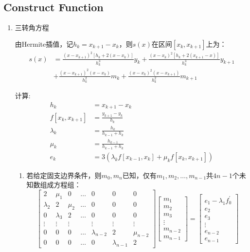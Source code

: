 \subsection{Construct Function}
\begin{enumerate}
\item 三转角方程

由Hermite插值，记$h_k = x_{k+1} - x_k$，则$s(x)$在区间$[x_k,x_{k+1}]$上为：
\begin{align}
s(x) &= \frac{(x-x_{k+1})^2 [h_{k}+2(x-x_{k})]}{h_{k}^3}y_{k}+\frac{(x-x_{k})^2 [h_{k}+2(x_{k+1}-x)]}{h_{k}^3}y_{k+1}\\
&+\frac{(x-x_{k+1})^2(x-x_k)}{h_k^2}m_k + \frac{(x-x_{k})^2(x-x_{k+1})}{h_k^2}m_{k+1}
\end{align}

计算:
\begin{align}
h_k &= x_{k+1} - x_k 
\\[4mm]
f[x_k,x_{k+1}] &= \frac{y_{k+1} - y_k}{h_k} 
\\[4mm]
\lambda_k &= \frac{h_k}{h_{k-1}+h_k} 
\\[4mm]
\mu_k &= \frac{h_{k-1}}{h_{k-1}+h_k} 
\\[4mm]
e_k &= 3(\lambda_k f[x_{k-1},x_k] + \mu_k f[x_k,x_{k+1}])
\end{align}

\begin{enumerate}
	\item 若给定固支边界条件，则$m_0,m_n$已知，仅有$m_1,m_2,\dots,m_{n-1}$共$4n-1$个未知数组成方程组：
		\begin{equation}
			\begin{bmatrix}
			2 & \mu_1 &0 &\dots &0 &0 &0 \\
			\lambda_2 &2 &\mu_2 &\dots &0 &0 &0 \\
			0 &\lambda_3 &2 &\dots &0 &0 &0 \\
			\vdots &\vdots &\vdots &\  &\vdots &\vdots &\vdots \\
			0 &0 &0 &\dots &\lambda_{n-2} &2 &\mu_{n-2} \\
			0 &0 &0 &\dots &0 &\lambda_{n-1} &2
			\end{bmatrix}
			\begin{bmatrix}
			m_1\\ m_2\\ m_3\\ \vdots \\ m_{n-2}\\ m_{n-1}
			\end{bmatrix}
			=
			\begin{bmatrix}
			e_1-\lambda_1f_0^{'}\\ e_2\\ e_3\\ \vdots \\ e_{n-2}\\ e_{n-1}
			\end{bmatrix}
		\end{equation}


\end{enumerate}
\end{enumerate}
